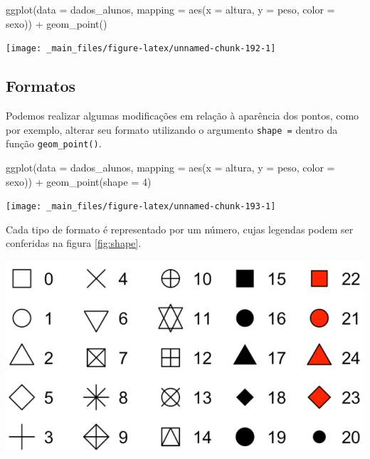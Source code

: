 \documentclass[
  brazilian,
]{book}
\newenvironment{Shaded}{\begin{snugshade}}{\end{snugshade}}
\newcommand{\AttributeTok}[1]{\textcolor[rgb]{0.77,0.63,0.00}{#1}}
\newcommand{\DecValTok}[1]{\textcolor[rgb]{0.00,0.00,0.81}{#1}}
\newcommand{\FunctionTok}[1]{\textcolor[rgb]{0.00,0.00,0.00}{#1}}
\newcommand{\NormalTok}[1]{#1}
\newcommand{\SpecialCharTok}[1]{\textcolor[rgb]{0.00,0.00,0.00}{#1}}
\let\origfigure\figure
\let\endorigfigure\endfigure
\renewenvironment{figure}[1][2] {
    \expandafter\origfigure\expandafter[H]
} {
    \endorigfigure
}
\begin{document}
\begin{Shaded}
\begin{Highlighting}[]
\FunctionTok{ggplot}\NormalTok{(}\AttributeTok{data =}\NormalTok{ dados\_alunos,}
       \AttributeTok{mapping =} \FunctionTok{aes}\NormalTok{(}\AttributeTok{x =}\NormalTok{ altura,}
                     \AttributeTok{y =}\NormalTok{ peso,}
                     \AttributeTok{color =}\NormalTok{ sexo)) }\SpecialCharTok{+}
  \FunctionTok{geom\_point}\NormalTok{()}
\end{Highlighting}
\end{Shaded}

\begin{center}\texttt{[image: \_main\_files/figure-latex/unnamed-chunk-192-1]} \end{center}

\hypertarget{formatos}{%
\subsection{Formatos}\label{formatos}}

Podemos realizar algumas modificações em relação à aparência dos pontos, como por exemplo, alterar seu formato utilizando o argumento \texttt{shape\ =} dentro da função \texttt{geom\_point()}.

\begin{Shaded}
\begin{Highlighting}[]
\FunctionTok{ggplot}\NormalTok{(}\AttributeTok{data =}\NormalTok{ dados\_alunos,}
       \AttributeTok{mapping =} \FunctionTok{aes}\NormalTok{(}\AttributeTok{x =}\NormalTok{ altura,}
                     \AttributeTok{y =}\NormalTok{ peso,}
                     \AttributeTok{color =}\NormalTok{ sexo)) }\SpecialCharTok{+}
  \FunctionTok{geom\_point}\NormalTok{(}\AttributeTok{shape =} \DecValTok{4}\NormalTok{)}
\end{Highlighting}
\end{Shaded}

\begin{center}\texttt{[image: \_main\_files/figure-latex/unnamed-chunk-193-1]} \end{center}

Cada tipo de formato é representado por um número, cujas legendas podem ser conferidas na figura \ref{fig:shape}.

\begin{figure}

{\centering \includegraphics[width=0.7\linewidth]{imagens/shapes} 

}

\caption{Legendas dos tipos de formatos de pontos, indicados no argumento `shape`. Fonte: R for Data Science, 2017.}\label{fig:shape}
\end{figure}
\end{document}

